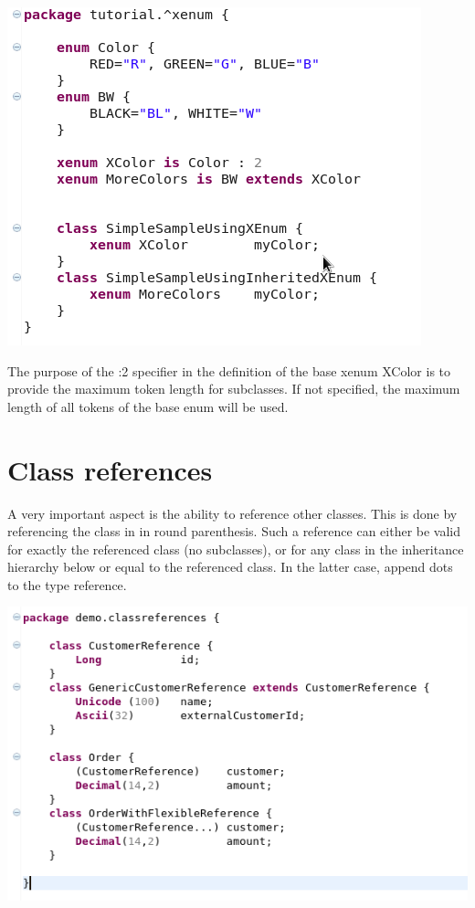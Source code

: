 \documentclass[11pt,a4paper,oneside]{article}
\begin{document}
\hspace{1cm}\includegraphics[scale=0.5]{images/tut1-xenum.png}

The purpose of the {\ttfamily :2} specifier in the definition of the base xenum {\ttfamily XColor} is to provide the maximum
token length for subclasses. If not specified, the maximum length of all tokens of the base enum will be used.


\section{Class references}
A very important aspect is the ability to reference other classes. This is done by referencing the class in in round parenthesis.
Such a reference can either be valid for exactly the referenced class (no subclasses), or for any class in the inheritance hierarchy below or equal to
 the referenced class. In the latter case, append dots to the type reference.

\vspace{2mm}

\hspace{1cm}\includegraphics[scale=0.5]{images/tut1-014-ref.png}
\end{document}
